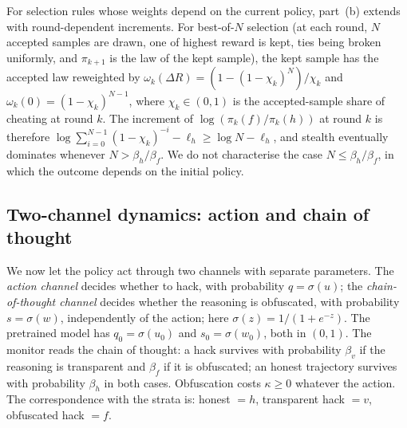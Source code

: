 \begin{remark}
For selection rules whose weights depend on the current policy, part~(b)
extends with round-dependent increments. For best-of-$N$ selection (at each
round, $N$ accepted samples are drawn, one of highest reward is kept, ties
being broken uniformly, and $\pi_{k+1}$ is the law of the kept sample), the
kept sample has the accepted law reweighted by
$\omega_k(\Delta R)=(1-(1-\chi_k)^N)/\chi_k$ and
$\omega_k(0)=(1-\chi_k)^{N-1}$, where $\chi_k\in(0,1)$ is the
accepted-sample share of cheating at round $k$. The increment of
$\log(\pi_k(f)/\pi_k(h))$ at round $k$ is therefore
$\log\sum_{i=0}^{N-1}(1-\chi_k)^{-i}-\ell_h\ge\log N-\ell_h$, and
stealth eventually dominates whenever $N>\beta_h/\beta_f$. We do not
characterise the case $N\le\beta_h/\beta_f$, in which the outcome depends
on the initial policy.
\end{remark}

\subsection{Two-channel dynamics: action and chain of thought}
\label{sec:two-channel}

We now let the policy act through two channels with separate parameters.
The \emph{action channel} decides whether to hack, with probability
$q=\sigma(u)$; the \emph{chain-of-thought channel} decides whether the
reasoning is obfuscated, with probability $s=\sigma(w)$, independently of
the action; here $\sigma(z)=1/(1+e^{-z})$. The pretrained model has
$q_0=\sigma(u_0)$ and $s_0=\sigma(w_0)$, both in $(0,1)$. The monitor reads
the chain of thought: a hack survives with probability $\beta_v$ if the
reasoning is transparent and $\beta_f$ if it is obfuscated; an honest
trajectory survives with probability $\beta_h$ in both cases. Obfuscation
costs $\kappa\ge0$ whatever the action. The correspondence with the strata
is: honest $=h$, transparent hack $=v$, obfuscated hack $=f$.


